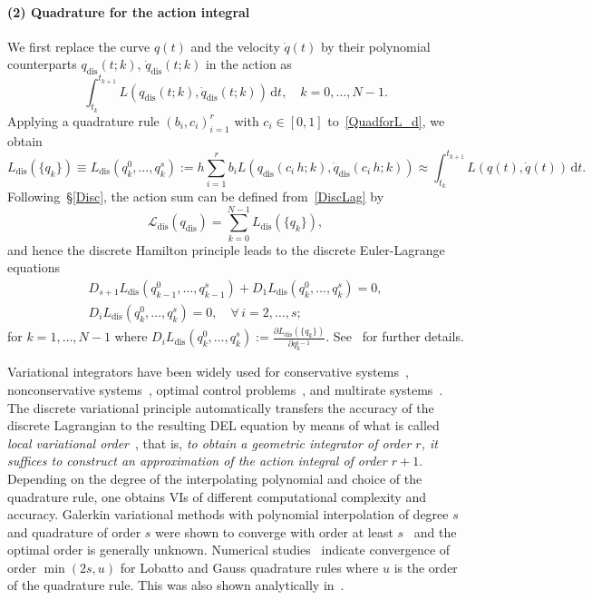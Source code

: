 \documentclass[a4paper,10pt,reqno]{amsart}
\theoremstyle{definition}
\newcommand{\dd}{\mathrm{d}}
\newcommand{\dis}{\text{dis}}
\begin{document}
\paragraph{(2) Quadrature for the action integral} We first replace the curve $q(t)$ and the velocity $\dot q(t)$ by their polynomial counterparts $q_\dis^{}(t;k)$, $\dot q_\dis^{}(t;k)$ in the action as
\begin{equation}\label{QuadforL_d}
    \int_{t_k}^{t_{k+1}}L(q_\dis^{}(t;k),\dot q_\dis^{}(t;k))\,\dd t,\quad k=0,\ldots, N-1.
\end{equation}
Applying a quadrature rule $(b_i,c_i)_{i=1}^r$ with $c_i\in[0,1]$ to~\eqref{QuadforL_d}, we obtain
\begin{equation}\label{DiscLag}
L_\dis(\{q_k\})\equiv L_\dis(q_k^0, \ldots,q_k^s):=h\sum_{i=1}^rb_iL(q_\dis^{}(c_i\,h;k),\dot q_\dis^{}(c_i\,h;k))\approx \int_{t_k}^{t_{k+1}}L(q(t),\dot q(t))\,\dd t.
\end{equation}
Following~\S\ref{Disc}, the action sum can be defined from~\eqref{DiscLag} by
\[
\mathcal{L}_\dis(q_\dis^{})=\sum_{k=0}^{N-1}L_\dis(\{q_k\}),
\]
and hence the discrete Hamilton principle leads to the discrete Euler-Lagrange equations
\[
\begin{split}
D_{s+1}L_\dis(q_{k-1}^0,\ldots,q_{k-1}^s)+D_1L_\dis(q_{k}^0,\ldots,q_{k}^s)=0,\\
D_iL_\dis(q_{k}^0,\ldots,q_{k}^s)=0,\quad  \forall\,i=2,\ldots,s;
\end{split}
\]
for $k=1,\ldots,N-1$ where $D_iL_\dis(q_k^{0},\ldots,q_k^{s}):=\frac{\partial L_\dis(\{q_k\})}{\partial q_k^{i-1}}$. See~\cite{MaWe, SinaSaake} for further details.

Variational integrators have been widely used for conservative systems~\cite{HaLe13,Leok2011,SinaSaake,Ca13}, nonconservative systems~\cite{SinaVerm,ShPaWo}, optimal control problems~\cite{Ca14}, and multirate systems~\cite{SinaWeGaLe,WeSinaLe,LeSina}. The discrete variational principle automatically transfers the accuracy of 
  the discrete Lagrangian to the resulting DEL equation by means of what is called {\it local variational order}~\cite{MaWe}, that is,  \textit{to obtain a geometric integrator of order $r$, it suffices to construct an  approximation of the action integral of order $r+1$}. Depending on the degree of the interpolating polynomial and choice of the quadrature rule, one obtains  VIs of different computational complexity and accuracy.  Galerkin variational methods with polynomial interpolation of degree $s$ and quadrature of order $s$ were shown to converge with order at least $s$~\cite{HaLe13} and the optimal order is generally unknown. Numerical studies~\cite{SinaSaake} indicate convergence of order $\min(2s, u)$ for Lobatto and Gauss quadrature rules where $u$ is the order of the  quadrature rule.  This was also shown analytically in~\cite{SinaVerm}.
\end{document}
